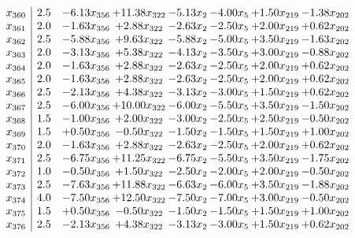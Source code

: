 \documentclass[8pt]{article}
\begin{document}
\[\begin{array}{c| c c@{\hskip 2pt} c@{\hskip 2pt} c@{\hskip 2pt} c@{\hskip 2pt} c@{\hskip 2pt} c@{\hskip 2pt} }
 x_{360}   &  2.5 & -6.13 x_{356} & + 11.38 x_{322} & -5.13 x_{2} & -4.00 x_{5} & +  1.50 x_{219} & -1.38 x_{202}\\
 x_{361}   &  2.0 & -1.63 x_{356} & +  2.88 x_{322} & -2.63 x_{2} & -2.50 x_{5} & +  2.00 x_{219} & +  0.62 x_{202}\\
 x_{362}   &  2.5 & -5.88 x_{356} & +  9.63 x_{322} & -5.88 x_{2} & -5.00 x_{5} & +  3.50 x_{219} & -1.63 x_{202}\\
 x_{363}   &  2.0 & -3.13 x_{356} & +  5.38 x_{322} & -4.13 x_{2} & -3.50 x_{5} & +  3.00 x_{219} & -0.88 x_{202}\\
 x_{364}   &  2.0 & -1.63 x_{356} & +  2.88 x_{322} & -2.63 x_{2} & -2.50 x_{5} & +  2.00 x_{219} & +  0.62 x_{202}\\
 x_{365}   &  2.0 & -1.63 x_{356} & +  2.88 x_{322} & -2.63 x_{2} & -2.50 x_{5} & +  2.00 x_{219} & +  0.62 x_{202}\\
 x_{366}   &  2.5 & -2.13 x_{356} & +  4.38 x_{322} & -3.13 x_{2} & -3.00 x_{5} & +  1.50 x_{219} & +  0.62 x_{202}\\
 x_{367}   &  2.5 & -6.00 x_{356} & + 10.00 x_{322} & -6.00 x_{2} & -5.50 x_{5} & +  3.50 x_{219} & -1.50 x_{202}\\
 x_{368}   &  1.5 & -1.00 x_{356} & +  2.00 x_{322} & -3.00 x_{2} & -2.50 x_{5} & +  2.50 x_{219} & -0.50 x_{202}\\
 x_{369}   &  1.5 & +  0.50 x_{356} & -0.50 x_{322} & -1.50 x_{2} & -1.50 x_{5} & +  1.50 x_{219} & +  1.00 x_{202}\\
 x_{370}   &  2.0 & -1.63 x_{356} & +  2.88 x_{322} & -2.63 x_{2} & -2.50 x_{5} & +  2.00 x_{219} & +  0.62 x_{202}\\
 x_{371}   &  2.5 & -6.75 x_{356} & + 11.25 x_{322} & -6.75 x_{2} & -5.50 x_{5} & +  3.50 x_{219} & -1.75 x_{202}\\
 x_{372}   &  1.0 & -0.50 x_{356} & +  1.50 x_{322} & -2.50 x_{2} & -2.00 x_{5} & +  2.00 x_{219} & -0.50 x_{202}\\
 x_{373}   &  2.5 & -7.63 x_{356} & + 11.88 x_{322} & -6.63 x_{2} & -6.00 x_{5} & +  3.50 x_{219} & -1.88 x_{202}\\
 x_{374}   &  4.0 & -7.50 x_{356} & + 12.50 x_{322} & -7.50 x_{2} & -7.00 x_{5} & +  3.00 x_{219} & -0.50 x_{202}\\
 x_{375}   &  1.5 & +  0.50 x_{356} & -0.50 x_{322} & -1.50 x_{2} & -1.50 x_{5} & +  1.50 x_{219} & +  1.00 x_{202}\\
 x_{376}   &  2.5 & -2.13 x_{356} & +  4.38 x_{322} & -3.13 x_{2} & -3.00 x_{5} & +  1.50 x_{219} & +  0.62 x_{202}\\

\end{array}\]
\end{document}
